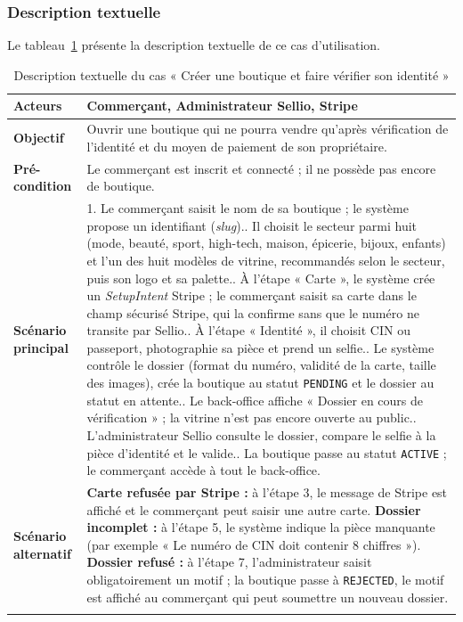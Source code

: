 \subsubsection{Description textuelle}
Le tableau~\ref{tab:uc-kyc} présente la description textuelle de ce cas d'utilisation.
\renewcommand{\arraystretch}{1.5}
\begin{longtable}{|p{4cm}|p{11cm}|}
\hline
\textbf{Acteurs} & Commerçant, Administrateur Sellio, Stripe \\
\hline
\textbf{Objectif} & Ouvrir une boutique qui ne pourra vendre qu'après vérification de l'identité et du moyen de paiement de son propriétaire. \\
\hline
\textbf{Pré-condition} & Le commerçant est inscrit et connecté ; il ne possède pas encore de boutique. \\
\hline
\textbf{Scénario principal} &
1. Le commerçant saisit le nom de sa boutique ; le système propose un identifiant (\textit{slug}).\newline
2. Il choisit le secteur parmi huit (mode, beauté, sport, high-tech, maison, épicerie, bijoux, enfants) et l'un des huit modèles de vitrine, recommandés selon le secteur, puis son logo et sa palette.\newline
3. À l'étape « Carte », le système crée un \textit{SetupIntent} Stripe ; le commerçant saisit sa carte dans le champ sécurisé Stripe, qui la confirme sans que le numéro ne transite par Sellio.\newline
4. À l'étape « Identité », il choisit CIN ou passeport, photographie sa pièce et prend un selfie.\newline
5. Le système contrôle le dossier (format du numéro, validité de la carte, taille des images), crée la boutique au statut \texttt{PENDING} et le dossier au statut en attente.\newline
6. Le back-office affiche « Dossier en cours de vérification » ; la vitrine n'est pas encore ouverte au public.\newline
7. L'administrateur Sellio consulte le dossier, compare le selfie à la pièce d'identité et le valide.\newline
8. La boutique passe au statut \texttt{ACTIVE} ; le commerçant accède à tout le back-office. \\
\hline
\textbf{Scénario alternatif} &
\textbf{Carte refusée par Stripe :} à l'étape 3, le message de Stripe est affiché et le commerçant peut saisir une autre carte.\newline
\textbf{Dossier incomplet :} à l'étape 5, le système indique la pièce manquante (par exemple « Le numéro de CIN doit contenir 8 chiffres »).\newline
\textbf{Dossier refusé :} à l'étape 7, l'administrateur saisit obligatoirement un motif ; la boutique passe à \texttt{REJECTED}, le motif est affiché au commerçant qui peut soumettre un nouveau dossier. \\
\hline
\caption{Description textuelle du cas « Créer une boutique et faire vérifier son identité »}
\label{tab:uc-kyc}
\end{longtable}


